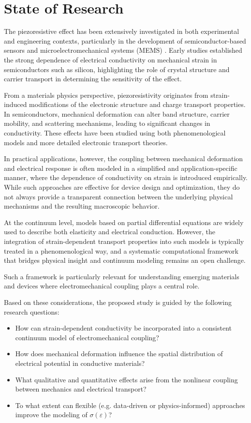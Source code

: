 \section{State of Research}

The piezoresistive effect has been extensively investigated in both experimental and engineering contexts, 
particularly in the development of semiconductor-based sensors and microelectromechanical systems (MEMS) \cite{smith1954,doll2013}. 
Early studies established the strong dependence of electrical conductivity on mechanical strain in semiconductors such as silicon, 
highlighting the role of crystal structure and carrier transport in determining the sensitivity of the effect.

From a materials physics perspective, piezoresistivity originates from strain-induced modifications of the electronic structure 
and charge transport properties. In semiconductors, mechanical deformation can alter band structure, carrier mobility, and scattering mechanisms, 
leading to significant changes in conductivity. These effects have been studied using both phenomenological models and more detailed 
electronic transport theories.

In practical applications, however, the coupling between mechanical deformation and electrical response is often modeled in a simplified 
and application-specific manner, where the dependence of conductivity on strain is introduced empirically. While such approaches are effective 
for device design and optimization, they do not always provide a transparent connection between the underlying physical mechanisms and the 
resulting macroscopic behavior.

At the continuum level, models based on partial differential equations are widely used to describe both elasticity and electrical conduction. 
However, the integration of strain-dependent transport properties into such models is typically treated in a phenomenological way, and a 
systematic computational framework that bridges physical insight and continuum modeling remains an open challenge.

Such a framework is particularly relevant for understanding emerging materials and 
devices where electromechanical coupling plays a central role.

Based on these considerations, the proposed study is guided by the following research questions:

\begin{itemize}
    \item How can strain-dependent conductivity be incorporated into a consistent continuum model of electromechanical coupling?
    \item How does mechanical deformation influence the spatial distribution of electrical potential in conductive materials?
    \item What qualitative and quantitative effects arise from the nonlinear coupling between mechanics and electrical transport?
    \item To what extent can flexible (e.g. data-driven or physics-informed) approaches improve the modeling of $\sigma(\varepsilon)$?
\end{itemize}

